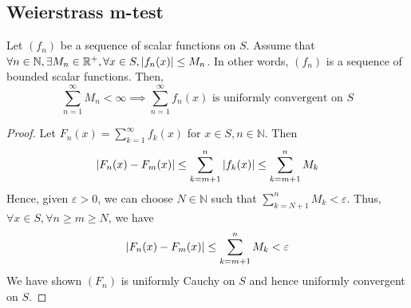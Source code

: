 \subsection{Weierstrass m-test}
\begin{theorem}
	Let \( (f_n) \) be a sequence of scalar functions on \( S \).
	Assume that \( \forall n \in \mathbb N, \exists M_n \in \mathbb R^+, \forall x \in S, \abs{f_n(x)} \leq M_n \).
	In other words, \( (f_n) \) is a sequence of bounded scalar functions.
	Then,
	\[
		\sum_{n = 1}^\infty M_n < \infty \implies \sum_{n=1}^\infty f_n(x) \text{ is uniformly convergent on } S
	\]
\end{theorem}
\begin{proof}
	Let \( F_n(x) = \sum_{k=1}^\infty f_k(x) \) for \( x \in S, n \in \mathbb N \).
	Then
	\[
		\abs{F_n(x) - F_m(x)} \leq \sum_{k=m+1}^n \abs{f_k(x)} \leq \sum_{k=m+1}^n M_k
	\]
	Hence, given \( \varepsilon > 0 \), we can choose \( N \in \mathbb N \) such that \( \sum_{k=N+1}^n M_k < \varepsilon \).
	Thus, \( \forall x \in S, \forall n \geq m \geq N \), we have
	\[
		\abs{F_n(x) - F_m(x)} \leq \sum_{k=m+1}^n M_k < \varepsilon
	\]
	We have shown \( (F_n) \) is uniformly Cauchy on \( S \) and hence uniformly convergent on \( S \).
\end{proof}


